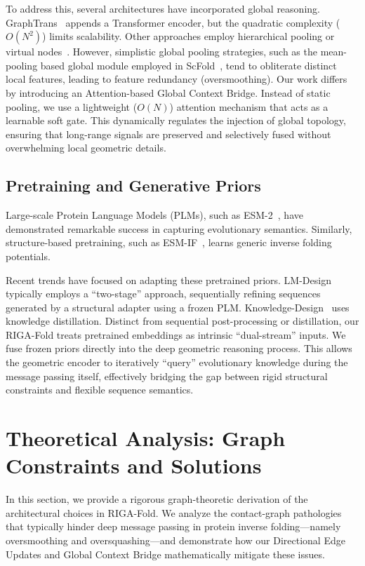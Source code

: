 \documentclass{article}
\theoremstyle{plain}
\theoremstyle{definition}
\theoremstyle{remark}
\begin{document}
{To address this, several architectures have incorporated global reasoning. GraphTrans~\cite{ingraham2019generative} appends a Transformer encoder, but the quadratic complexity ($O(N^2)$) limits scalability. Other approaches employ hierarchical pooling or virtual nodes~\cite{li2021training}. However, simplistic global pooling strategies, such as the mean-pooling based global module employed in ScFold~\cite{zhong2025scfold}, tend to obliterate distinct local features, leading to feature redundancy (oversmoothing). Our work differs by introducing an Attention-based Global Context Bridge. Instead of static pooling, we use a lightweight ($O(N)$) attention mechanism that acts as a learnable soft gate. This dynamically regulates the injection of global topology, ensuring that long-range signals are preserved and selectively fused without overwhelming local geometric details.

\subsection{Pretraining and Generative Priors}
Large-scale Protein Language Models (PLMs), such as ESM-2~\cite{lin2023evolutionary}, have demonstrated remarkable success in capturing evolutionary semantics. Similarly, structure-based pretraining, such as ESM-IF~\cite{hsu2022learning}, learns generic inverse folding potentials.

Recent trends have focused on adapting these pretrained priors. LM-Design~\cite{zheng2023structure} typically employs a ``two-stage'' approach, sequentially refining sequences generated by a structural adapter using a frozen PLM. Knowledge-Design~\cite{gao2024kwdesign} uses knowledge distillation. Distinct from sequential post-processing or distillation, our RIGA-Fold treats pretrained embeddings as intrinsic ``dual-stream'' inputs. We fuse frozen priors directly into the deep geometric reasoning process. This allows the geometric encoder to iteratively ``query'' evolutionary knowledge during the message passing itself, effectively bridging the gap between rigid structural constraints and flexible sequence semantics.

\section{Theoretical Analysis: Graph Constraints and Solutions}
\label{sec:appendix_theory}

In this section, we provide a rigorous graph-theoretic derivation of the architectural choices in RIGA-Fold. We analyze the contact-graph pathologies that typically hinder deep message passing in protein inverse folding—namely oversmoothing and oversquashing—and demonstrate how our Directional Edge Updates and Global Context Bridge mathematically mitigate these issues.

}
\end{document}

